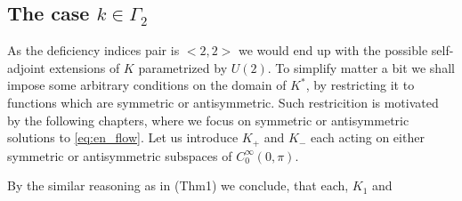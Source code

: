 \subsection*{The case $k\in\Gamma_2$}

As the deficiency indices pair is $<2,2>$ we would end up with the
possible self-adjoint extensions of $K$ parametrized by $U(2)$. To
simplify matter a bit we shall impose some arbitrary conditions on the
domain of $K^*$, by restricting it to functions which are symmetric or
antisymmetric. Such restricition is motivated by the following
chapters, where we focus on symmetric or antisymmetric solutions to
\eqref{eq:en_flow}. Let us introduce $K_+$ and $K_-$ each acting on
either symmetric or antisymmetric subspaces of $C_0^\infty(0,\pi)$.

By the similar reasoning as in (Thm1) we conclude, that each, $K_1$
and $$

